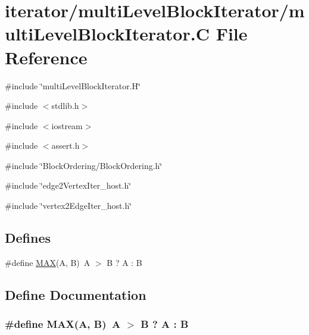 \hypertarget{multiLevelBlockIterator_8C}{
\section{iterator/multiLevelBlockIterator/multiLevelBlockIterator.C File Reference}
\label{multiLevelBlockIterator_8C}
}
{\ttfamily \#include \char`\"{}multiLevelBlockIterator.H\char`\"{}}\par
{\ttfamily \#include $<$stdlib.h$>$}\par
{\ttfamily \#include $<$iostream$>$}\par
{\ttfamily \#include $<$assert.h$>$}\par
{\ttfamily \#include \char`\"{}BlockOrdering/BlockOrdering.h\char`\"{}}\par
{\ttfamily \#include \char`\"{}edge2VertexIter\_\-host.h\char`\"{}}\par
{\ttfamily \#include \char`\"{}vertex2EdgeIter\_\-host.h\char`\"{}}\par
\subsection*{Defines}
\begin{DoxyCompactItemize}
\item 
\#define \hyperlink{multiLevelBlockIterator_8C_ad935f1ff1a50822e317bdb321ce991ad}{MAX}(A, B)~A $>$ B ? A : B
\end{DoxyCompactItemize}


\subsection{Define Documentation}
\hypertarget{multiLevelBlockIterator_8C_ad935f1ff1a50822e317bdb321ce991ad}{
\subsubsection[{MAX}]{\setlength{\rightskip}{0pt plus 5cm}\#define MAX(A, \/  B)~A $>$ B ? A : B}}
\label{multiLevelBlockIterator_8C_ad935f1ff1a50822e317bdb321ce991ad}
